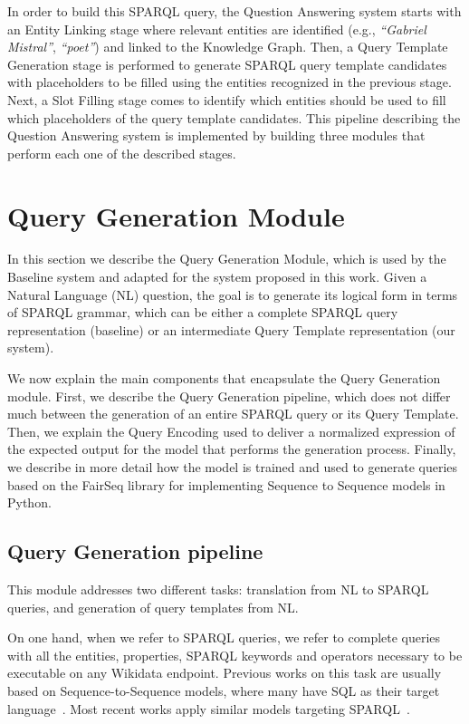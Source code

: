 In order to build this SPARQL query, the Question Answering system starts with an Entity 
Linking stage where relevant entities are identified (e.g., \textit{“Gabriel Mistral”}, 
\textit{“poet”}) and linked to the Knowledge Graph. Then, a Query Template Generation stage 
is performed to generate SPARQL query template candidates with placeholders to be filled 
using the entities recognized in the previous stage. Next, a Slot Filling stage comes to 
identify which entities should be used to fill which placeholders of the query template 
candidates. This pipeline describing the Question Answering system is implemented by building 
three modules that perform each one of the described stages. 

\section{Query Generation Module}
In this section we describe the Query Generation Module, which is used by the Baseline system 
and adapted for the system proposed in this work. Given a Natural Language (NL) question, the 
goal is to generate its logical form in terms of SPARQL grammar, which can be either a 
complete SPARQL query representation (baseline) or an intermediate Query Template 
representation (our system). 

We now explain the main components that encapsulate the Query Generation module. First, we 
describe the Query Generation pipeline, which does not differ much between the generation of 
an entire SPARQL query or its Query Template. Then, we explain the Query Encoding used to 
deliver a normalized expression of the expected output for the model that performs the 
generation process. Finally, we describe in more detail how the model is trained and used to 
generate queries based on the FairSeq library for implementing Sequence to Sequence models in 
Python.

\subsection{Query Generation pipeline}
This module addresses two different tasks: translation from NL to SPARQL queries, and 
generation of query templates from NL. 

On one hand, when we refer to SPARQL queries, we refer to complete queries with all the 
entities, properties, SPARQL keywords and operators necessary to be executable on any 
Wikidata endpoint. Previous works on this task are usually based on Sequence-to-Sequence 
models, where many have SQL as their target language~\cite{nmt:DongL16, nmt:CaiXZYLL18, 
nmt:ZhongCoRR17}. Most recent works apply similar models targeting SPARQL~\cite{nmt:CoRRLuz18, 
nmt:nspm-SoruMMPVEN17, nmt:CoRRSoru18}.

